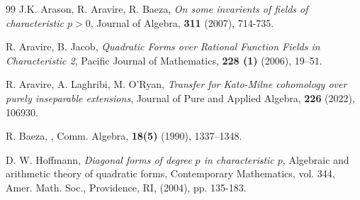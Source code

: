 \documentclass[times,10pt]{amsart}
\newcommand{\dd}{{\rm d}}
\newcommand{\F}{\ensuremath{\mathcal{F}}}
\newtheorem{prop}[thm]{Proposition}%
\begin{document}
{      %

       



 
\begin{thebibliography}{99}
 J.K. Arason, R. Aravire, R. Baeza,\textit{ On some invarients of fields of characteristic $p>0$}, Journal of  Algebra, {\bf{311}} (2007), 714-735.

  R. Aravire,  B. Jacob, \textit{Quadratic Forms over Rational Function Fields in Characteristic 2}, Pacific Journal of Mathematics, {\bf  228 (1)} (2006), 19--51.
  
   R. Aravire,  A. Laghribi,  M. O'Ryan, {\it Transfer for Kato-Milne cohomology over purely inseparable extensions}, Journal of Pure and Applied Algebra, {\bf 226} (2022), 106930.

 


 R. Baeza, , Comm. Algebra, {\bf 18(5)} (1990), 1337--1348.


	D. W. Hoffmann,
	\textit{Diagonal forms of degree {$p$} in characteristic {$p$}},
	Algebraic and arithmetic theory of quadratic forms,
	Contemporary Mathematics,
	vol.  344,
	Amer. Math. Soc., Providence, RI,
	(2004), pp. 135-183.



\end{thebibliography}}
\end{document}

